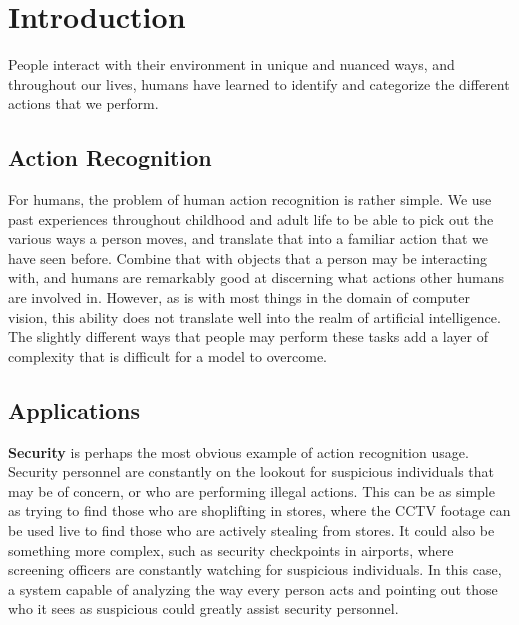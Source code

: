 
\chapter{Introduction} %

\label{Chapter1} %

People interact with their environment in unique and nuanced ways, and throughout our lives, humans have learned to identify and categorize the different actions that we perform.

\section{Action Recognition}

For humans, the problem of human action recognition is rather simple. We use past experiences throughout childhood and adult life to be able to pick out the various ways a person moves, and translate that into a familiar action that we have seen before. Combine that with objects that a person may be interacting with, and humans are remarkably good at discerning what actions other humans are involved in. However, as is with most things in the domain of computer vision, this ability does not translate well into the realm of artificial intelligence. The slightly different ways that people may perform these tasks add a layer of complexity that is difficult for a model to overcome.

\section{Applications}

\textbf{Security} is perhaps the most obvious example of action recognition usage. Security personnel are constantly on the lookout for suspicious individuals that may be of concern, or who are performing illegal actions. This can be as simple as trying to find those who are shoplifting in stores, where the CCTV footage can be used live to find those who are actively stealing from stores. It could also be something more complex, such as security checkpoints in airports, where screening officers are constantly watching for suspicious individuals. In this case, a system capable of analyzing the way every person acts and pointing out those who it sees as suspicious could greatly assist security personnel.

